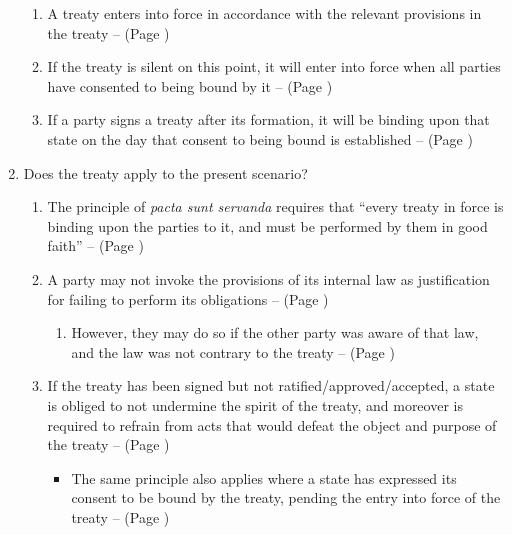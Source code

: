 \begin{enumerate}
    \begin{enumerate}
        \item A treaty enters into force in accordance with the relevant provisions in the treaty --  (Page \pageref{VCLT Art 24})
        \item If the treaty is silent on this point, it will enter into force when all parties have consented to being bound by it --  (Page \pageref{VCLT Art 24})
        \item If a party signs a treaty after its formation, it will be binding upon that state on the day that consent to being bound is established --  (Page \pageref{VCLT Art 24})
    \end{enumerate}
    \item Does the treaty apply to the present scenario?
    \begin{enumerate}
        \item The principle of \textit{pacta sunt servanda} requires that ``every treaty in force is binding upon the parties to it, and must be performed by them in good faith'' --  (Page \pageref{VCLT Art 26})
        \item A party may not invoke the provisions of its internal law as justification for failing to perform its obligations --  (Page \pageref{VCLT Art 27})
        \begin{enumerate}
            \item However, they may do so if the other party was aware of that law, and the law was not contrary to the treaty --  (Page \pageref{VCLT Art 46})
        \end{enumerate}
        \item If the treaty has been signed but not ratified/approved/accepted, a state is obliged to not undermine the spirit of the treaty, and moreover is required to refrain from acts that would defeat the object and purpose of the treaty --  (Page \pageref{VCLT Art 18})
        \begin{itemize}
            \item The same principle also applies where a state has expressed its consent to be bound by the treaty, pending the entry into force of the treaty --  (Page \pageref{VCLT Art 18})
        \end{itemize}

\end{enumerate}
\end{enumerate}
